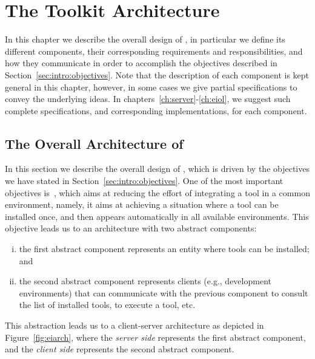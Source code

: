 {%
}


\chapter{The \ei Toolkit Architecture}
\label{ch:architecture}

In this chapter we describe the overall design of \ei, in particular
we define its different components, their corresponding requirements
and responsibilities, and how they communicate in order to accomplish
the objectives described in Section~\ref{sec:intro:objectives}.
%
Note that the description of each \ei component is kept general in
this chapter, however, in some cases we give partial specifications to
convey the underlying ideas.
%
In chapters~\ref{ch:server}-\ref{ch:eiol}, we suggest such complete
specifications, and corresponding implementations, for each component.




\section{The Overall Architecture of \ei}
\label{ch:architecture:overallarch}

In this section we describe the overall design of \ei, which is driven
by the objectives we have stated in
Section~\ref{sec:intro:objectives}.
%
One of the most important objectives is~, which
aims at reducing the effort of integrating a tool in a common
environment, namely, it aims at achieving a situation where a tool can
be installed once, and then appears automatically in all available
environments.
%
This objective leads us to an architecture with two abstract
components:
%
\begin{enumerate}[(i)]
\item the first abstract component represents an entity where tools
  can be installed; and
\item the second abstract component represents clients (e.g.,
  development environments) that can communicate with the previous
  component to consult the list of installed tools, to execute a tool,
  etc.
\end{enumerate}
%
This abstraction leads us to a client-server architecture as depicted
in Figure~\ref{fig:eiarch}, where the \emph{server side} represents
the first abstract component, and the \emph{client side} represents
the second abstract component.

